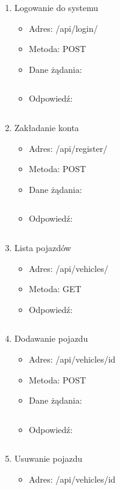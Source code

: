 \begin{enumerate}
	\item Logowanie do systemu
	\renewcommand{\labelitemi}{\textperiodcentered}
	\begin{itemize}
		\item Adres: /api/login/
		\item Metoda: POST
		\item Dane żądania:
		\inputminted[fontsize=\footnotesize]{json}{src/api/login.json}
		\item Odpowiedź:
		\inputminted[fontsize=\footnotesize]{json}{src/api/login-response.json}
	\end{itemize}
	\item Zakładanie konta
	\renewcommand{\labelitemi}{\textperiodcentered}
	\begin{itemize}
		\item Adres: /api/register/
		\item Metoda: POST
		\item Dane żądania:
		\inputminted[fontsize=\footnotesize]{json}{src/api/register.json}
		\item Odpowiedź:
		\inputminted[fontsize=\footnotesize]{json}{src/api/register-response.json}
	\end{itemize}
	\item Lista pojazdów
	\renewcommand{\labelitemi}{\textperiodcentered}
	\begin{itemize}
		\item Adres: /api/vehicles/
		\item Metoda: GET
		\item Odpowiedź:
		\inputminted[fontsize=\footnotesize]{json}{src/api/vehicles-response.json}
	\end{itemize}
	\item Dodawanie pojazdu
	\renewcommand{\labelitemi}{\textperiodcentered}
	\begin{itemize}
		\item Adres: /api/vehicles/{{id}}
		\item Metoda: POST
		\item Dane żądania:
		\inputminted[fontsize=\footnotesize]{json}{src/api/vehicles_post.json}
		\item Odpowiedź:
		\inputminted[fontsize=\footnotesize]{json}{src/api/vehicle-created.json}
	\end{itemize}
	\item Usuwanie pojazdu
	\renewcommand{\labelitemi}{\textperiodcentered}
	\begin{itemize}
		\item Adres: /api/vehicles/{{id}}

\end{itemize}
\end{enumerate}
